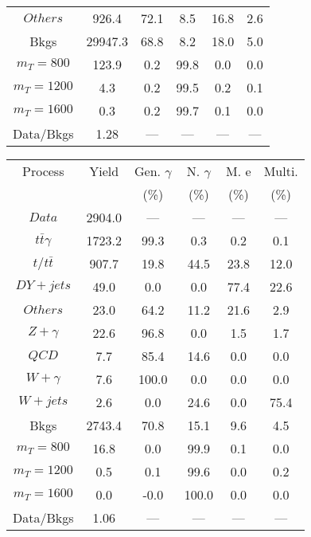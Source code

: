 \begin{figure}
\begin{minipage}[c]{0.32\textwidth}
{\begin{tabular}{cccccc}
$ Others $ &  926.4 &  72.1 &  8.5 &  16.8 &  2.6\\
Bkgs &  29947.3 &  68.8 &  8.2 &  18.0 &  5.0\\
$ m_{T} = 800 $ &  123.9 &  0.2 &  99.8 &  0.0 &  0.0\\
$ m_{T} = 1200 $ &  4.3 &  0.2 &  99.5 &  0.2 &  0.1\\
$ m_{T} = 1600 $ &  0.3 &  0.2 &  99.7 &  0.1 &  0.0\\
Data/Bkgs &  1.28 &  --- &  --- &  --- &  ---\\
\hline
\end{tabular}
}
\end{minipage}
\begin{minipage}[c]{0.32\textwidth}
\centering
\tiny{
\begin{tabular}{cccccc}
\hline
Process & Yield & Gen. $\gamma$ & N. $\gamma$ & M. e & Multi. \\
 &  & (\%) & (\%) & (\%) & (\%)  \\
\hline
                                                                      $ Data $ &  2904.0 &  --- &  --- &  --- &  ---\\
$ t\bar{t}\gamma $ &  1723.2 &  99.3 &  0.3 &  0.2 &  0.1\\
$ t/t\bar{t} $ &  907.7 &  19.8 &  44.5 &  23.8 &  12.0\\
$ DY+jets $ &  49.0 &  0.0 &  0.0 &  77.4 &  22.6\\
$ Others $ &  23.0 &  64.2 &  11.2 &  21.6 &  2.9\\
$ Z+\gamma $ &  22.6 &  96.8 &  0.0 &  1.5 &  1.7\\
$ QCD $ &  7.7 &  85.4 &  14.6 &  0.0 &  0.0\\
$ W+\gamma $ &  7.6 &  100.0 &  0.0 &  0.0 &  0.0\\
$ W+jets $ &  2.6 &  0.0 &  24.6 &  0.0 &  75.4\\
Bkgs &  2743.4 &  70.8 &  15.1 &  9.6 &  4.5\\
$ m_{T} = 800 $ &  16.8 &  0.0 &  99.9 &  0.1 &  0.0\\
$ m_{T} = 1200 $ &  0.5 &  0.1 &  99.6 &  0.0 &  0.2\\
$ m_{T} = 1600 $ &  0.0 &  -0.0 &  100.0 &  0.0 &  0.0\\
Data/Bkgs &  1.06 &  --- &  --- &  --- &  ---\\
\hline
\end{tabular}
}
\end{minipage}
\begin{minipage}[c]{0.32\textwidth}
\centering
\tiny{
}
\end{minipage}
\end{figure}
